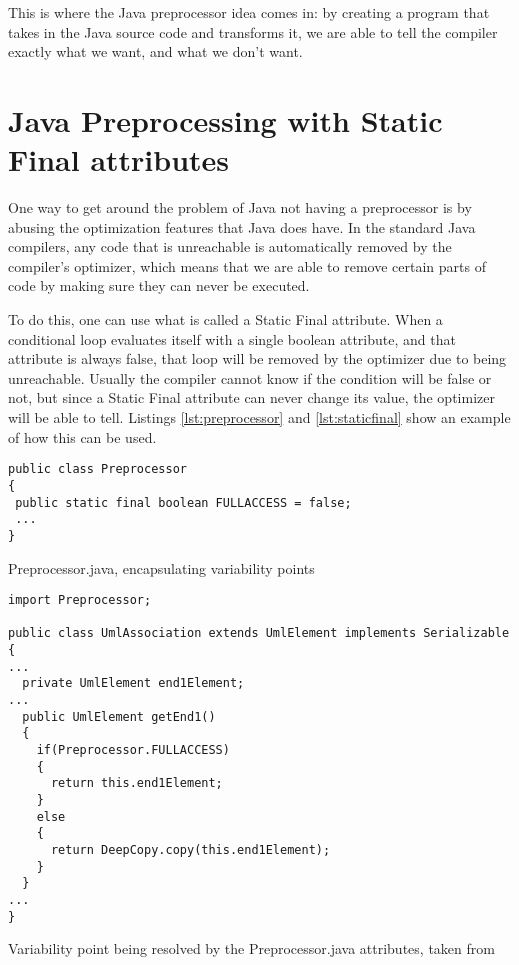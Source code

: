 This is where the Java preprocessor idea comes in: by creating a program that takes in the Java source code and transforms it, we are able to tell the compiler exactly what we want, and what we don't want.


\section{Java Preprocessing with Static Final attributes}

One way to get around the problem of Java not having a preprocessor is by abusing the optimization features that Java does have. In the standard Java compilers, any code that is unreachable is automatically removed by the compiler's optimizer, which means that we are able to remove certain parts of code by making sure they can never be executed.

To do this, one can use what is called a Static Final attribute. When a conditional loop evaluates itself with a single boolean attribute, and that attribute is always false, that loop will be removed by the optimizer due to being unreachable. Usually the compiler cannot know if the condition will be false or not, but since a Static Final attribute can never change its value, the optimizer will be able to tell. Listings \ref{lst:preprocessor} and \ref{lst:staticfinal} show an example of how this can be used.

\begin{listing}
\begin{verbatim}
public class Preprocessor
{
 public static final boolean FULLACCESS = false;
 ...
}
\end{verbatim}
\caption{Preprocessor.java, encapsulating variability points} \label{lst:preprocessor}
\end{listing}

\begin{listing}
\begin{verbatim}
import Preprocessor;

public class UmlAssociation extends UmlElement implements Serializable
{
...
  private UmlElement end1Element;
...
  public UmlElement getEnd1()
  {
    if(Preprocessor.FULLACCESS)
    {
      return this.end1Element;
    }
    else
    {
      return DeepCopy.copy(this.end1Element);
    }
  }
...
}
\end{verbatim}
\caption{Variability point being resolved by the Preprocessor.java attributes, taken from \cite{AUTOREST}} \label{lst:staticfinal}
\end{listing}

